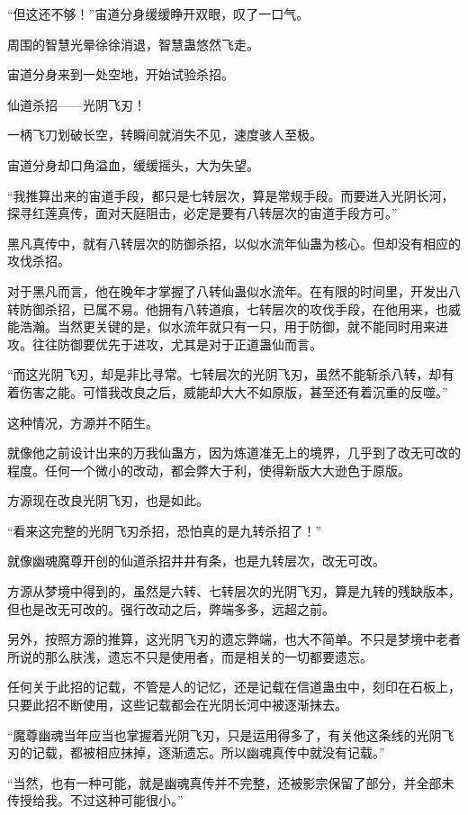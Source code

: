 \begin{this_body}
“但这还不够！”宙道分身缓缓睁开双眼，叹了一口气。

周围的智慧光晕徐徐消退，智慧蛊悠然飞走。

宙道分身来到一处空地，开始试验杀招。

仙道杀招——光阴飞刃！

一柄飞刀划破长空，转瞬间就消失不见，速度骇人至极。

宙道分身却口角溢血，缓缓摇头，大为失望。

“我推算出来的宙道手段，都只是七转层次，算是常规手段。而要进入光阴长河，探寻红莲真传，面对天庭阻击，必定是要有八转层次的宙道手段方可。”

黑凡真传中，就有八转层次的防御杀招，以似水流年仙蛊为核心。但却没有相应的攻伐杀招。

对于黑凡而言，他在晚年才掌握了八转仙蛊似水流年。在有限的时间里，开发出八转防御杀招，已属不易。他拥有八转道痕，七转层次的攻伐手段，在他用来，也威能浩瀚。当然更关键的是，似水流年就只有一只，用于防御，就不能同时用来进攻。往往防御要优先于进攻，尤其是对于正道蛊仙而言。

“而这光阴飞刃，却是非比寻常。七转层次的光阴飞刃，虽然不能斩杀八转，却有着伤害之能。可惜我改良之后，威能却大大不如原版，甚至还有着沉重的反噬。”

这种情况，方源并不陌生。

就像他之前设计出来的万我仙蛊方，因为炼道准无上的境界，几乎到了改无可改的程度。任何一个微小的改动，都会弊大于利，使得新版大大逊色于原版。

方源现在改良光阴飞刃，也是如此。

“看来这完整的光阴飞刃杀招，恐怕真的是九转杀招了！”

就像幽魂魔尊开创的仙道杀招井井有条，也是九转层次，改无可改。

方源从梦境中得到的，虽然是六转、七转层次的光阴飞刃，算是九转的残缺版本，但也是改无可改的。强行改动之后，弊端多多，远超之前。

另外，按照方源的推算，这光阴飞刃的遗忘弊端，也大不简单。不只是梦境中老者所说的那么肤浅，遗忘不只是使用者，而是相关的一切都要遗忘。

任何关于此招的记载，不管是人的记忆，还是记载在信道蛊虫中，刻印在石板上，只要此招不断使用，这些记载都会在光阴长河中被逐渐抹去。

“魔尊幽魂当年应当也掌握着光阴飞刃，只是运用得多了，有关他这条线的光阴飞刃的记载，都被相应抹掉，逐渐遗忘。所以幽魂真传中就没有记载。”

“当然，也有一种可能，就是幽魂真传并不完整，还被影宗保留了部分，并全部未传授给我。不过这种可能很小。”


\end{this_body}
